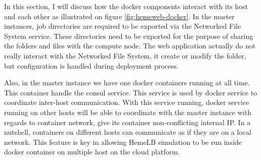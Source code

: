 \noindent%
\begin{minipage}{\linewidth}%
\label{fig:hemeweb-docker}%
\end{minipage}

\vspace{1cm}

In this section, I will discuss how the docker components interact with its host and each other as illustrated on figure \ref{fig:hemeweb-docker}. In the master instances, job directories are required to be exported via the Networked File System service. These directories need to be exported for the purpose of sharing the folders and files with the compute node. The web application actually do not really interact with the Networked File System, it create or modify the folder, but configuration is handled during deployment process.

Also, in the master instance we have one docker containers running at all time. This container handle the consul service. This service is used by docker service to coordinate inter-host communication. With this service running, docker service running on other hosts will be able to coordinate with the master instance with regards to container network, give its container non-conflicting internal IP. In a nutshell, containers on different hosts can communicate as if they are on a local network. This feature is key in allowing HemeLB simulation to be run inside docker container on multiple host on the cloud platform.

